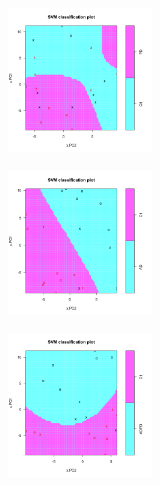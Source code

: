 \begin{figure}[H]
\begin{subfigure}[b]{0.33\linewidth}
\centering
\includegraphics[width=1.5in]{./Figures/fig4/Fig4a-Frontal-Cortex_CtlvsPD.png}
\end{subfigure}%
\begin{subfigure}[b]{0.33\linewidth}
\centering
\includegraphics[width=1.5in]{./Figures/fig4/Fig4b-Frontal-Cortex_CtlvsAD.png}
\end{subfigure}%
\begin{subfigure}[b]{0.33\linewidth}
\centering
\includegraphics[width=1.5in]{./Figures/fig4/Fig4c-Frontal-Cortex_CtlvsADPD.png}
\end{subfigure}


\end{figure}
